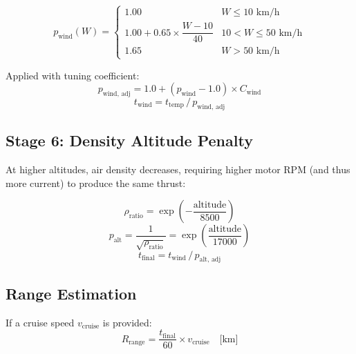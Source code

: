 \documentclass[11pt,a4paper]{article}
\begin{document}
\begin{equation}
    p_{\text{wind}}(W) =
    \begin{cases}
        1.00 & W \leq 10 \text{ km/h} \\
        1.00 + 0.65 \times \dfrac{W - 10}{40} & 10 < W \leq 50 \text{ km/h} \\
        1.65 & W > 50 \text{ km/h}
    \end{cases}
\end{equation}

Applied with tuning coefficient:
\begin{equation}
    p_{\text{wind, adj}} = 1.0 + (p_{\text{wind}} - 1.0) \times C_{\text{wind}}
\end{equation}
\begin{equation}
    t_{\text{wind}} = t_{\text{temp}} \,/\, p_{\text{wind, adj}}
\end{equation}

\subsection{Stage 6: Density Altitude Penalty}
At higher altitudes, air density decreases, requiring higher motor RPM (and thus more current) to produce the same thrust:

\begin{equation}
    \rho_{\text{ratio}} = \exp\left(-\frac{\text{altitude}}{8500}\right)
\end{equation}
\begin{equation}
    p_{\text{alt}} = \frac{1}{\sqrt{\rho_{\text{ratio}}}} = \exp\left(\frac{\text{altitude}}{17000}\right)
\end{equation}
\begin{equation}
    t_{\text{final}} = t_{\text{wind}} \,/\, p_{\text{alt, adj}}
\end{equation}

\subsection{Range Estimation}
If a cruise speed $v_{\text{cruise}}$ is provided:
\begin{equation}
    R_{\text{range}} = \frac{t_{\text{final}}}{60} \times v_{\text{cruise}} \quad \text{[km]}
\end{equation}
\end{document}

